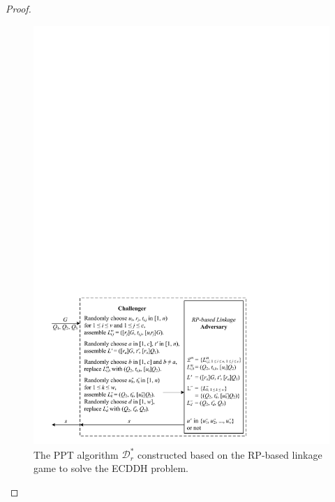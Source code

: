 \begin{proof}
  \begin{figure}[tb]
    \centering
    \includegraphics[width=1.0\linewidth]{fig/rp-linkage-game.pdf}
    \caption{The PPT algorithm $\mathcal{D}^*_r$ constructed based on the RP-based linkage game to solve the ECDDH problem.}
    \label{fig:dalgorithm}
  \end{figure}



\end{proof}
